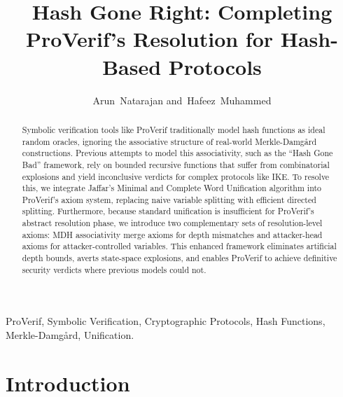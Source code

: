 \documentclass[journal]{IEEEtran}
\begin{document}
\title{Hash Gone Right: Completing ProVerif's Resolution for Hash-Based Protocols}


\author{Arun~Natarajan
        and~Hafeez~Muhammed
}



%
{}






\maketitle

\begin{abstract}
Symbolic verification tools like ProVerif traditionally model hash functions as ideal random oracles, ignoring the associative structure of real-world Merkle-Damg\aa{}rd constructions. Previous attempts to model this associativity, such as the ``Hash Gone Bad'' framework, rely on bounded recursive functions that suffer from combinatorial explosions and yield inconclusive verdicts for complex protocols like IKE. To resolve this, we integrate Jaffar’s Minimal and Complete Word Unification algorithm into ProVerif’s axiom system, replacing naive variable splitting with efficient directed splitting. Furthermore, because standard unification is insufficient for ProVerif's abstract resolution phase, we introduce two complementary sets of resolution-level axioms: MDH associativity merge axioms for depth mismatches and attacker-head axioms for attacker-controlled variables. This enhanced framework eliminates artificial depth bounds, averts state-space explosions, and enables ProVerif to achieve definitive security verdicts where previous models could not.
\end{abstract}

\begin{IEEEkeywords}
ProVerif, Symbolic Verification, Cryptographic Protocols, Hash Functions, Merkle-Damg\aa{}rd, Unification.
\end{IEEEkeywords}



\IEEEpeerreviewmaketitle


\section{Introduction}
\end{document}
